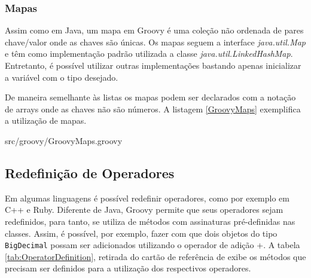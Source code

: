 \documentclass[12pt]{article}
\begin{document}
\subsubsection{Mapas}

    Assim como em Java, um mapa em Groovy é uma coleção não ordenada de pares 
    chave/valor onde as chaves são únicas. Os mapas seguem a interface \emph{java.util.Map}
    e têm como implementação padrão utilizada a classe \emph{java.util.LinkedHashMap}.
    Entretanto, é possível utilizar outras implementações bastando apenas inicializar
    a variável com o tipo desejado.
    
    De maneira semelhante às listas os mapas podem ser declarados com a notação
    de arrays onde as chaves não são números. A listagem \ref{GroovyMaps} exemplifica
    a utilização de mapas.
    
    
                    {src/groovy/GroovyMaps.groovy}
    
\subsection{Redefinição de Operadores}  
    
    Em algumas linguagens é possível redefinir operadores, como por exemplo em 
    C++ e Ruby. Diferente de Java, Groovy permite que seus operadores sejam redefinidos,
    para tanto, se utiliza de métodos com assinaturas pré-definidas nas classes.
    Assim, é possível, por exemplo, fazer com que dois objetos do tipo \texttt{BigDecimal}
    possam ser adicionados utilizando o operador de adição +. A tabela 
    \ref{tab:OperatorDefinition}, retirada do cartão de referência de \cite{groovy:refcard} 
    exibe os métodos que precisam ser definidos para a utilização dos respectivos 
    operadores.
\end{document}
